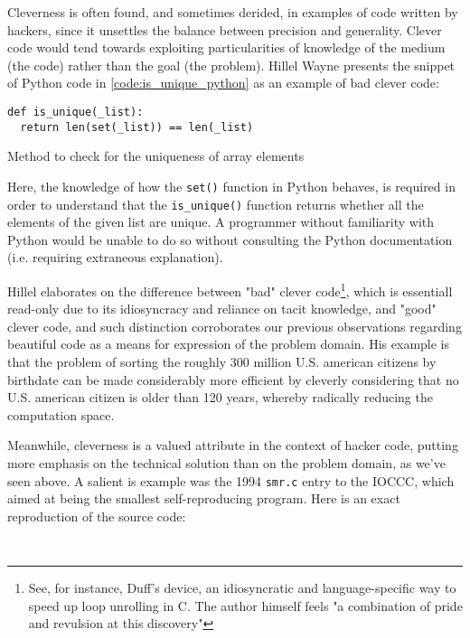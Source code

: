 Cleverness is often found, and sometimes derided, in examples of  code written by hackers, since it unsettles the balance between precision and generality. Clever code would tend towards exploiting particularities of knowledge of the medium (the code) rather than the goal (the problem). Hillel Wayne presents the snippet of Python code in \ref{code:is_unique_python} as an example of bad clever code:

\begin{listing}
  \begin{verbatim}
def is_unique(_list):
  return len(set(_list)) == len(_list)
\end{verbatim}
  \caption{Method to check for the uniqueness of array elements}
  \label{code:is_unique_python}
\end{listing}

Here, the knowledge of how the \lstinline{set()} function in Python behaves, is required in order to understand that the \lstinline{is_unique()} function returns whether all the elements of the given list are unique. A programmer without familiarity with Python would be unable to do so without consulting the Python documentation (i.e. requiring extraneous explanation).

Hillel elaborates on the difference between "bad" clever code\footnote{See, for instance, Duff's device, an idiosyncratic and language-specific way to speed up loop unrolling in C. The author himself feels "a combination of pride and revulsion at this discovery"\cite{duff_tom_1983}}, which is essentiall read-only due to its idiosyncracy and reliance on tacit knowledge, and "good" clever code, and such distinction corroborates our previous observations regarding beautiful code as a means for expression of the problem domain. His example is that the problem of sorting the roughly 300 million U.S. american citizens by birthdate can be made considerably more efficient by cleverly considering that no U.S. american citizen is older than 120 years, whereby radically reducing the computation space.

Meanwhile, cleverness is a valued attribute in the context of hacker code, putting more emphasis on the technical solution than on the problem domain, as we've seen above. A salient is example was the 1994 \lstinline{smr.c} entry to the IOCCC, which aimed at being the smallest self-reproducing program\cite{kanakarakis_international_2022}. Here is an exact reproduction of the source code:

\begin{lstlisting}
  
\end{lstlisting}


